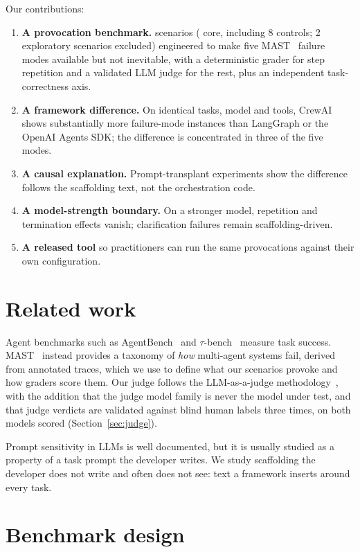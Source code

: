 \documentclass[10pt,twocolumn]{article}
\begin{document}
Our contributions:
\begin{enumerate}
\item \textbf{A provocation benchmark.} \nScenarios{} scenarios (\nCore{} core,
  including 8 controls; 2 exploratory scenarios excluded) engineered to make five MAST~\cite{mast} failure modes
  available but not inevitable, with a deterministic grader for step repetition
  and a validated LLM judge for the rest, plus an independent task-correctness
  axis.
\item \textbf{A framework difference.} On identical tasks, model and tools,
  CrewAI shows substantially more failure-mode instances than LangGraph or the
  OpenAI Agents SDK; the difference is concentrated in three of the five modes.
\item \textbf{A causal explanation.} Prompt-transplant experiments show the
  difference follows the scaffolding text, not the orchestration code.
\item \textbf{A model-strength boundary.} On a stronger model, repetition and
  termination effects vanish; clarification failures remain scaffolding-driven.
\item \textbf{A released tool} so practitioners can run the same provocations
  against their own configuration.
\end{enumerate}

\section{Related work}

Agent benchmarks such as AgentBench~\cite{agentbench} and
$\tau$-bench~\cite{taubench} measure task success. MAST~\cite{mast} instead
provides a taxonomy of \emph{how} multi-agent systems fail, derived from
annotated traces, which we use to define what our scenarios provoke and how
graders score them. Our judge follows the LLM-as-a-judge
methodology~\cite{judge}, with the addition that the judge model family is never
the model under test, and that judge verdicts are validated against blind human
labels three times, on both models scored (Section~\ref{sec:judge}).

Prompt sensitivity in LLMs is well documented, but it is usually studied as a
property of a task prompt the developer writes. We study scaffolding the
developer does not write and often does not see: text a framework inserts
around every task.

\section{Benchmark design}
\end{document}
